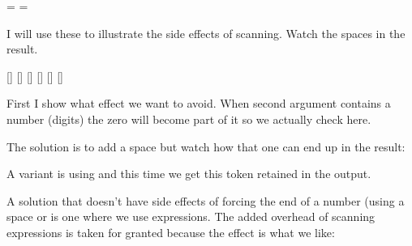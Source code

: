\startbuffer
\newdimen\MyDimenA \MyDimenA=1pt  =\MyDimenA
\newdimen\MyDimenB \MyDimenB=2pt  =\MyDimenB
\stopbuffer

\typebuffer[option=TEX] \getbuffer

I will use these to illustrate the side effects of scanning. Watch the spaces
in the result.


\startbuffer[b]
\starttabulate[|T|T|]
\NC \type {\whatever{1pt}{2pt}}         \NC \edef\temp{\whatever        {1pt}{2pt}}[\meaning\temp] \NC \NR
\NC \type {\whatever{1pt}{1pt}}         \NC \edef\temp{\whatever        {1pt}{1pt}}[\meaning\temp] \NC \NR
\NC {} \NC \edef\temp{}[\meaning\temp] \NC \NR
\NC {} \NC \edef\temp{}[\meaning\temp] \NC \NR
\NC \type {\whatever\MyDimenA\MyDimenB} \NC \edef\temp{\whatever\MyDimenA\MyDimenB}[\meaning\temp] \NC \NR
\NC \type {\whatever\MyDimenA\MyDimenB} \NC \edef\temp{\whatever\MyDimenA\MyDimenB}[\meaning\temp] \NC \NR
\stoptabulate
\stopbuffer

First I show what effect we want to avoid. When second argument contains a number
(digits) the zero will become part of it so we actually check 
here.

\startbuffer[c][option=TEX]
\stopbuffer

\typebuffer[c][option=TEX] \getbuffer[c,b]

The solution is to add a space but watch how that one can end up in the result:

\startbuffer[c][option=TEX]
\stopbuffer

\typebuffer[c][option=TEX] \getbuffer[c,b]

A variant is using \type {\relax} and this time we get this token retained in
the output.

\startbuffer[c][option=TEX]
\stopbuffer

\typebuffer[c][option=TEX] \getbuffer[c,b]

A solution that doesn't have side effects of forcing the end of a number (using a
space or \type {\relax} is one where we use expressions. The added overhead of
scanning expressions is taken for granted because the effect is what we like:

